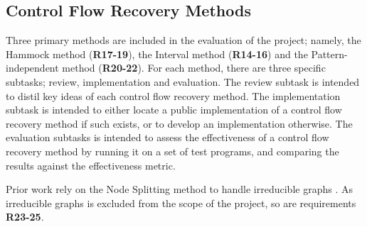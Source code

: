 
\subsection{Control Flow Recovery Methods}
\label{sec:req_control_flow_recovery_methods}

Three primary methods are included in the evaluation of the project; namely, the Hammock method (\textbf{R17-19}), the Interval method (\textbf{R14-16}) and the Pattern-independent method (\textbf{R20-22}). For each method, there are three specific subtasks; review, implementation and evaluation. The review subtask is intended to distil key ideas of each control flow recovery method. The implementation subtask is intended to either locate a public implementation of a control flow recovery method if such exists, or to develop an implementation otherwise. The evaluation subtasks is intended to assess the effectiveness of a control flow recovery method by running it on a set of test programs, and comparing the results against the effectiveness metric.

Prior work rely on the Node Splitting method to handle irreducible graphs \cite{node_splitting}. As irreducible graphs is excluded from the scope of the project, so are requirements \textbf{R23-25}.

